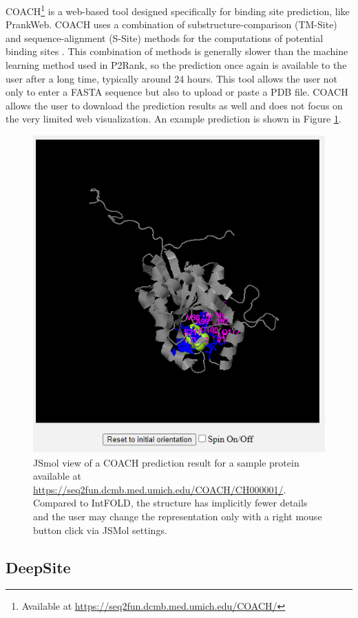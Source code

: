 COACH\footnote{Available at \url{https://seq2fun.dcmb.med.umich.edu/COACH/}} is a web-based tool designed specifically for binding site prediction, like PrankWeb. COACH uses a combination of substructure-comparison (TM-Site) and sequence-alignment (S-Site) methods for the computations of potential binding sites \cite{yang2013protein}. This combination of methods is generally slower than the machine learning method used in P2Rank, so the prediction once again is available to the user after a long time, typically around 24 hours. This tool allows the user not only to enter a FASTA sequence but also to upload or paste a PDB file. COACH allows the user to download the prediction results as well and does not focus on the very limited web visualization. An example prediction is shown in Figure \ref{fig:coach_prediction}.

\begin{figure}
    \centering
    \includegraphics[width=.75\linewidth]{img/coach_prediction.png}
    \caption{JSmol view of a COACH prediction result for a sample protein available at \url{https://seq2fun.dcmb.med.umich.edu/COACH/CH000001/}. Compared to IntFOLD, the structure has implicitly fewer details and the user may change the representation only with a right mouse button click via JSMol settings.}
    \label{fig:coach_prediction}
\end{figure}

\subsection{DeepSite}
\label{subsec:deepsite}

